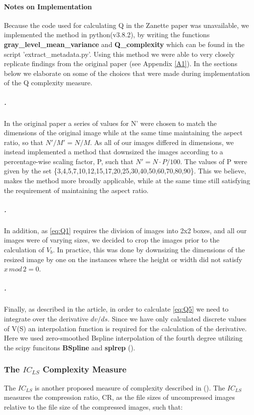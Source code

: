 \documentclass[12pt]{article}
\begin{document}
\paragraph{Notes on Implementation}
Because the code used for calculating Q in the Zanette paper was unavailable, we implemented the method in python(v3.8.2), by writing the functions \textbf{gray\_level\_mean\_variance} and \textbf{Q\_complexity} which can be found in the script 'extract\_metadata.py'. Using this method we were able to very closely replicate findings from the original paper (see Appendix \ref{A1}). In the sections below we elaborate on some of the choices that were made during implementation of the Q complexity measure.
\subparagraph{.}
In the original paper a series of values for N' were chosen to match the dimensions of the original image while at the same time maintaining the aspect ratio, so that $N'/M' = N/M$. As all of our images differed in dimensions, we instead implemented a method that downsized the images according to a percentage-wise scaling factor, P, such that $N' = N \cdot P/100$. The values of P were given by the set \{3,4,5,7,10,12,15,17,20,25,30,40,50,60,70,80,90\}. This we believe, makes the method more broadly applicable, while at the same time still satisfying the requirement of maintaining the aspect ratio.
\subparagraph{.}
In addition, as \ref{eq:Q1} requires the division of images into 2x2 boxes, and all our images were of varying sizes, we decided to crop the images prior to the calculation of $V_b$. In practice, this was done by downsizing the dimensions of the resized image by one on the instances where the height or width did not satisfy $x\,mod\,2 = 0$.
\subparagraph{.}
Finally, as described in the article, in order to calculate \ref{eq:Q5} we need to integrate over the derivative $dv/ds$. 
Since we have only calculated discrete values of V(S) an interpolation function is required for the calculation of the derivative. Here we used zero-smoothed Bspline interpolation of the fourth degree utilizing the scipy funcitons \textbf{BSpline} and \textbf{splrep} (\cite{virtanenSciPyFundamentalAlgorithms2020}).

\subsubsection{The $IC_{LS}$ Complexity Measure}\label{ICLS}
The $IC_{LS}$ is another proposed measure of complexity described in (\cite{yuImageComplexitySpatial2013}). 
The $IC_{LS}$ measures the compression ratio, CR, as the file sizes of uncompressed images relative to the file size of the compressed images, such that:
\end{document}
